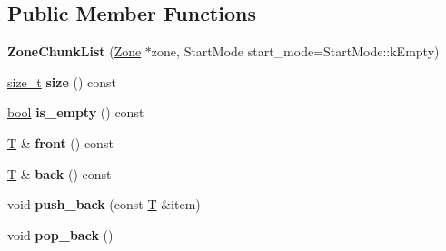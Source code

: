 \subsection*{Public Member Functions}
\begin{DoxyCompactItemize}
\item 
\mbox{\label{classv8_1_1internal_1_1ZoneChunkList_af3276988c3fc0740f76eba5c102915b3}} 
{\bfseries Zone\+Chunk\+List} (\mbox{\hyperlink{classv8_1_1internal_1_1Zone}{Zone}} $\ast$zone, Start\+Mode start\+\_\+mode=Start\+Mode\+::k\+Empty)
\item 
\mbox{\label{classv8_1_1internal_1_1ZoneChunkList_a9c0a9de3bb20dedc836317c219dab166}} 
\mbox{\hyperlink{classsize__t}{size\+\_\+t}} {\bfseries size} () const
\item 
\mbox{\label{classv8_1_1internal_1_1ZoneChunkList_a1a6213aafc16a3c4ff9921d254fcc417}} 
\mbox{\hyperlink{classbool}{bool}} {\bfseries is\+\_\+empty} () const
\item 
\mbox{\label{classv8_1_1internal_1_1ZoneChunkList_a6123f8a1d9bb7232db72b07c157fde08}} 
\mbox{\hyperlink{classv8_1_1internal_1_1torque_1_1T}{T}} \& {\bfseries front} () const
\item 
\mbox{\label{classv8_1_1internal_1_1ZoneChunkList_a4155146c20e269d6070752bddafd8595}} 
\mbox{\hyperlink{classv8_1_1internal_1_1torque_1_1T}{T}} \& {\bfseries back} () const
\item 
\mbox{\label{classv8_1_1internal_1_1ZoneChunkList_a1bfa2578fd6bf29b46d5f3a9b04199bb}} 
void {\bfseries push\+\_\+back} (const \mbox{\hyperlink{classv8_1_1internal_1_1torque_1_1T}{T}} \&item)
\item 
\mbox{\label{classv8_1_1internal_1_1ZoneChunkList_a6ed7733d9a5f4e2b662d0ea7554219ef}} 
void {\bfseries pop\+\_\+back} ()
\item 
\mbox{\label{classv8_1_1internal_1_1ZoneChunkList_a5b567f81ef5a6cdfe93edad692802e49}} 

\end{DoxyCompactItemize}
